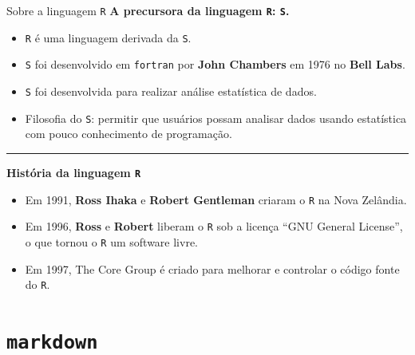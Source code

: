 \documentclass[
  10pt,
  ignorenonframetext,
]{beamer}
\providecommand{\tightlist}{%
  \setlength{\itemsep}{0pt}\setlength{\parskip}{0pt}}\usepackage{longtable,booktabs,array}
\newcommand*{\regrafina}{\rule{\textwidth}{0.5pt}}
\begin{document}
\begin{frame}[fragile]{Sobre a linguagem \texttt{R}}
\protect\hypertarget{sobre-a-linguagem-r}{}
\textbf{A precursora da linguagem \texttt{R}: \texttt{S}.}

\begin{itemize}
\tightlist
\item
  \texttt{R} é uma linguagem derivada da \texttt{S}.
\item
  \texttt{S} foi desenvolvido em \texttt{fortran} por \textbf{John
  Chambers} em 1976 no \textbf{Bell Labs}.
\item
  \texttt{S} foi desenvolvida para realizar análise estatística de
  dados.
\item
  Filosofia do \texttt{S}: permitir que usuários possam analisar dados
  usando estatística com pouco conhecimento de programação.
\end{itemize}

\regrafina

\textbf{História da linguagem \texttt{R}}

\begin{itemize}
\tightlist
\item
  Em 1991, \textbf{Ross Ihaka} e \textbf{Robert Gentleman} criaram o
  \texttt{R} na Nova Zelândia.
\item
  Em 1996, \textbf{Ross} e \textbf{Robert} liberam o \texttt{R} sob a
  licença ``GNU General License'', o que tornou o \texttt{R} um software
  livre.
\item
  Em 1997, The Core Group é criado para melhorar e controlar o código
  fonte do \texttt{R}.
\end{itemize}
\end{frame}

\hypertarget{markdown}{%
\section{\texorpdfstring{\texttt{markdown}}{markdown}}\label{markdown}}
\end{document}
